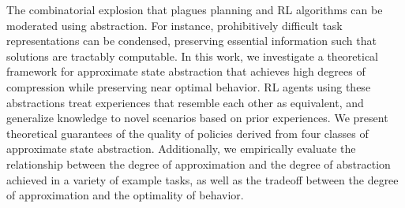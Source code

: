 The combinatorial explosion that plagues planning and \ac{RL} algorithms can be moderated using abstraction. For instance, prohibitively difficult task representations can be condensed, preserving essential information such that solutions are tractably computable. In this work, we investigate a theoretical framework for approximate state abstraction that achieves high degrees of compression while preserving near optimal behavior. \ac{RL} agents using these abstractions treat experiences that resemble each other as equivalent, and generalize knowledge to novel scenarios based on prior experiences. We present theoretical guarantees of the quality of policies derived from four classes of approximate state abstraction. Additionally, we empirically evaluate the relationship between the degree of approximation and the degree of abstraction achieved in a variety of example tasks, as well as the tradeoff between the degree of approximation and the optimality of behavior.
